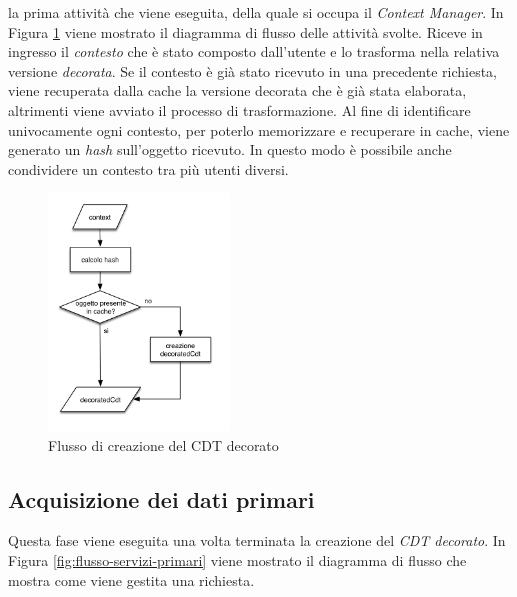 \upe la prima attività che viene eseguita, della quale si occupa il \emph{Context Manager}. In Figura \ref{fig:flusso-decorated-cdt} viene mostrato il diagramma di flusso delle attività svolte. Riceve in ingresso il \emph{contesto} che è stato composto dall'utente e lo trasforma nella relativa versione \emph{decorata}. Se il contesto è già stato ricevuto in una precedente richiesta, viene recuperata dalla cache la versione decorata che è già stata elaborata, altrimenti viene avviato il processo di trasformazione. Al fine di identificare univocamente ogni contesto, per poterlo memorizzare e recuperare in cache, viene generato un \emph{hash} sull'oggetto ricevuto. In questo modo è possibile anche condividere un contesto tra più utenti diversi.

\begin{figure}[ht]
	\centering
	\includegraphics[width=0.43\textwidth]{5-implementazione-backend/Immagini/diagramma_flusso_decoratedCdt.png}
	\caption{Flusso di creazione del CDT decorato\label{fig:flusso-decorated-cdt}}
\end{figure}

\subsection*{Acquisizione dei dati primari}

Questa fase viene eseguita una volta terminata la creazione del \emph{CDT decorato}. In Figura \ref{fig:flusso-servizi-primari} viene mostrato il diagramma di flusso che mostra come viene gestita una richiesta.

